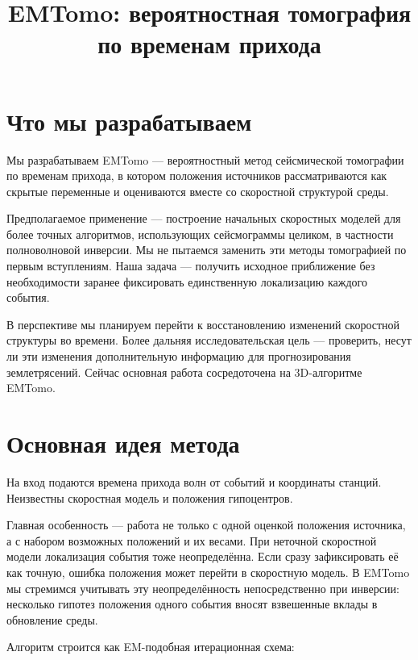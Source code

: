 \documentclass[12pt,a4paper]{article}
\title{EMTomo: вероятностная томография по временам прихода}
\author{}
\date{}
\begin{document}
\maketitle

\section*{Что мы разрабатываем}

Мы разрабатываем EMTomo --- вероятностный метод сейсмической
томографии по временам прихода, в котором положения источников
рассматриваются как скрытые переменные и оцениваются вместе со скоростной
структурой среды.

Предполагаемое применение --- построение начальных скоростных
моделей для более точных алгоритмов, использующих сейсмограммы целиком,
в частности полноволновой инверсии. Мы не пытаемся заменить эти методы
томографией по первым вступлениям. Наша задача --- получить исходное
приближение без необходимости заранее фиксировать единственную
локализацию каждого события.

В перспективе мы планируем перейти к восстановлению изменений
скоростной структуры во времени. Более дальняя исследовательская цель
--- проверить, несут ли эти изменения дополнительную информацию для
прогнозирования землетрясений. Сейчас основная работа сосредоточена
на 3D-алгоритме EMTomo.

\section*{Основная идея метода}

На вход подаются времена прихода волн от событий и координаты станций.
Неизвестны скоростная модель и положения гипоцентров.

Главная особенность --- работа не только с одной оценкой положения
источника, а с набором возможных положений и их весами. При неточной
скоростной модели локализация события тоже неопределённа. Если сразу
зафиксировать её как точную, ошибка положения может перейти в скоростную
модель. В EMTomo мы стремимся учитывать эту неопределённость
непосредственно при инверсии: несколько гипотез положения одного события
вносят взвешенные вклады в обновление среды.

Алгоритм строится как EM-подобная итерационная схема:
\end{document}
